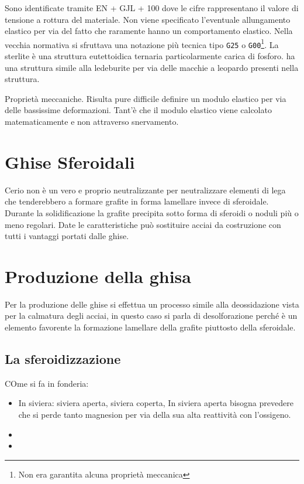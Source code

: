Sono identificate tramite EN + GJL + 100 dove le cifre rappresentano il valore di tensione a rottura del materiale. Non viene specificato l'eventuale allungamento elastico per via del fatto che raramente hanno un comportamento elastico.
Nella vecchia normativa si sfruttava una notazione più tecnica tipo \texttt{G25} o \texttt{G00}\footnote{Non era garantita alcuna proprietà meccanica}.
La sterlite è una struttura eutettoidica ternaria particolarmente carica di fosforo. ha una struttura simile alla ledeburite per via delle macchie a leopardo presenti nella struttura.

Proprietà meccaniche. Risulta pure difficile definire un modulo elastico per via delle bassissime deformazioni. Tant'è che il modulo elastico viene calcolato matematicamente e non attraverso snervamento.


\section{Ghise Sferoidali}
Cerio non è un vero e proprio neutralizzante per neutralizzare elementi di lega che tenderebbero a formare grafite in forma lamellare invece di sferoidale.
Durante la solidificazione la grafite precipita sotto forma di sferoidi o noduli più o meno regolari.
Date le caratteristiche può sostituire acciai da costruzione con tutti i vantaggi portati dalle ghise.

\section{Produzione della ghisa}
Per la produzione delle ghise si effettua un processo simile alla deossidazione vista per la calmatura degli acciai, in questo caso si parla di desolforazione perché è un elemento favorente la formazione lamellare della grafite piuttosto della sferoidale.
\subsection{La sferoidizzazione}
COme si fa in fonderia:
\begin{itemize}
\item In siviera: siviera aperta, siviera coperta, 
In siviera aperta bisogna prevedere che si perde tanto magnesion per via della sua alta reattività con l'ossigeno.
\item {}
\item {}
\end{itemize}